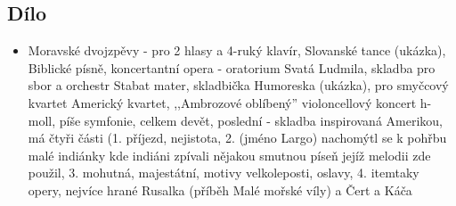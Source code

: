 \documentclass{article}
\begin{document}
\subsection{Dílo}
\begin{itemize}
  \item Moravské dvojzpěvy - pro 2 hlasy a 4-ruký klavír, Slovanské tance (ukázka), Biblické písně, koncertantní opera - oratorium Svatá Ludmila, skladba pro sbor a orchestr Stabat mater, skladbička Humoreska (ukázka), pro smyčcový kvartet Americký kvartet, ,,Ambrozové oblíbený” violoncellový koncert h-moll, píše symfonie, celkem devět, poslední - skladba inspirovaná Amerikou, má čtyři části (1. příjezd, nejistota, 2. (jméno Largo) nachomýtl se k pohřbu malé indiánky kde indiáni zpívali nějakou smutnou píseň jejíž melodii zde použil, 3. mohutná, majestátní, motivy velkoleposti, oslavy, 4. 
  itemtaky opery, nejvíce hrané Rusalka (příběh Malé mořské víly) a Čert a Káča
\end{itemize}
\end{document}
